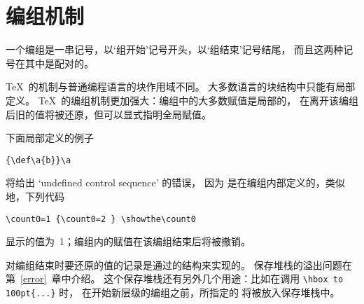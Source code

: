 \documentclass[letterpaper]{book}
\begin{document}
\section{编组机制}

一个编组是一串记号，以`组开始'记号开头，以`组结束'记号结尾，
而且这两种记号在其中是配对的。

\TeX\ 的机制与普通编程语言的块作用域不同。
大多数语言的块结构中只能有局部定义。
\TeX\ 的编组机制更加强大：编组中的大多数赋值是局部的，
在离开该编组后旧的值将被还原，但可以显式指明全局赋值。

下面局部定义的例子
\begin{verbatim}
{\def\a{b}}\a
\end{verbatim}
将给出 `undefined control sequence' 的错误，
因为  是在编组内部定义的，类似地，下列代码
\begin{verbatim}
\count0=1 {\count0=2 } \showthe\count0
\end{verbatim}
显示的值为~1；编组内的赋值在该编组结束后将被撤销。

对编组结束时要还原的值的记录是通过的结构来实现的。
保存堆栈的溢出问题在第~\ref{error}~章中介绍。
这个保存堆栈还有另外几个用途：比如在调用 \hbox{\verb>\hbox to 100pt{...}>} 时，
在开始新层级的编组之前，所指定的 \hbox{} 将被放入保存堆栈中。
\end{document}
